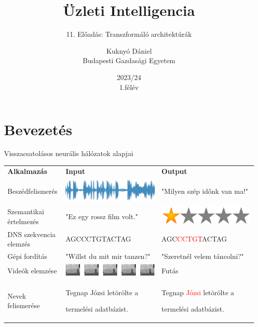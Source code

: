 \documentclass[english, aspectratio=169]{beamer}
\makeatletter
\newcommand\makebeamertitle{\frame{\maketitle}}
\let\origtableofcontents=\tableofcontents
\def\tableofcontents{\@ifnextchar[{\origtableofcontents}{\gobbletableofcontents}}
\def\gobbletableofcontents#1{\origtableofcontents}
\makeatother
\begin{document}
\section{Bevezetés}
\title[]{Üzleti Intelligencia}
\subtitle{11. Előadás: Transzformáló architektúrák}
\author[Kuknyó Dániel]{Kuknyó Dániel\\Budapesti Gazdasági Egyetem}
\date{2023/24\\1.félév}
\makebeamertitle

\begin{frame}
\tableofcontents{}
\end{frame}

\begin{frame}
\tableofcontents[currentsection]
\end{frame}

\begin{frame}{Visszacsatolásos neurális hálózatok alapjai}
\renewcommand{\arraystretch}{2.}
\begin{tabularx}{\textwidth}{m{4cm}m{5cm}m{5cm}}
\textbf{Alkalmazás} & \textbf{Input} & \textbf{Output} \\
	Beszédfelismerés & \includegraphics[width=.25\textwidth, keepaspectratio]{../../10_recurrent/doc/images/recurrent_1.png} & "Milyen szép időnk van ma!" \\
	Szemantikai értelmezés & "Ez egy rossz film volt." & \includegraphics[width=.2\textwidth, keepaspectratio]{../../10_recurrent/doc/images/recurrent_2.png} \\
	DNS szekvencia elemzés & AGCCCTGTACTAG & AGC\textcolor{red}{CCTGT}ACTAG \\
	Gépi fordítás & "Willst du mit mir tanzen?" & "Szeretnél velem táncolni?" \\
	Videók elemzése & \includegraphics[width=.3\textwidth, keepaspectratio]{../../10_recurrent/doc/images/recurrent_3.png} & Futás \\
	Nevek felismerése & Tegnap Józsi letörölte a\par termelési adatbázist. & Tegnap
\textcolor{red}{Józsi} letörölte a\par termelési adatbázist. \\
\end{tabularx}
\end{frame}
\end{document}
